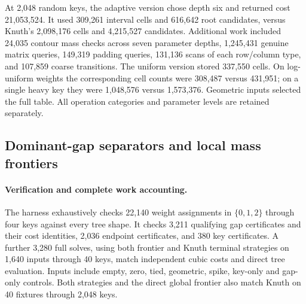 \documentclass[11pt]{article}
\begin{document}
At 2,048 random keys, the adaptive version chose depth six and returned
cost 21,053,524. It used 309,261 interval cells and 616,642 root candidates,
versus Knuth's 2,098,176 cells and 4,215,527 candidates. Additional work
included 24,035 contour mass checks across seven parameter depths,
1,245,431 genuine matrix queries, 149,319 padding queries, 131,136 scans
of each row/column type, and 107,859 coarse transitions. The uniform
version stored 337,550 cells. On log-uniform weights the corresponding
cell counts were 308,487 versus 431,951; on a single heavy key they were
1,048,576 versus 1,573,376. Geometric inputs selected the full table.
All operation categories and parameter levels are retained separately.


\subsection{Dominant-gap separators and local mass frontiers}
\paragraph{Verification and complete work accounting.}
The harness exhaustively checks 22,140 weight assignments in $\{0,1,2\}$
through four keys against every tree shape. It checks 3,211 qualifying gap
certificates and their cost identities, 2,036 endpoint certificates, and
380 key certificates. A further 3,280 full solves, using both frontier and
Knuth terminal strategies on 1,640 inputs through 40 keys, match independent
cubic costs and direct tree evaluation. Inputs include empty, zero, tied,
geometric, spike, key-only and gap-only controls. Both strategies and the
direct global frontier also match Knuth on 40 fixtures through 2,048 keys.
\end{document}
